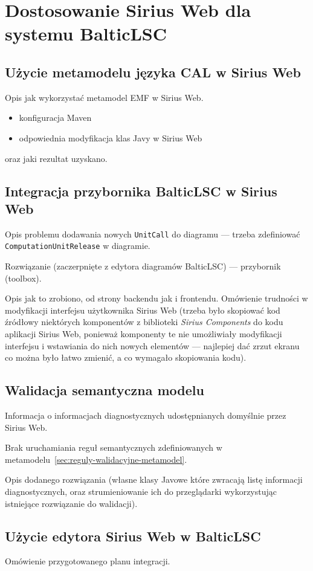 \chapter{Dostosowanie Sirius Web dla systemu BalticLSC}

\section{Użycie metamodelu języka CAL w Sirius Web}

Opis jak wykorzystać metamodel EMF w Sirius Web.

\begin{itemize}
	\item konfiguracja Maven
	\item odpowiednia modyfikacja klas Javy w Sirius Web
\end{itemize}

\noindent oraz jaki rezultat uzyskano.

\section{Integracja przybornika BalticLSC w Sirius Web}

Opis problemu dodawania nowych \texttt{UnitCall} do diagramu --- trzeba
zdefiniować \texttt{ComputationUnitRelease} w diagramie.

Rozwiązanie (zaczerpnięte z edytora diagramów BalticLSC) --- przybornik
(toolbox).

Opis jak to zrobiono, od strony backendu jak i frontendu. Omówienie trudności w
modyfikacji interfejsu użytkownika Sirius Web (trzeba było skopiować kod
źródłowy niektórych komponentów z biblioteki \textit{Sirius Components} do kodu
aplikacji Sirius Web, ponieważ komponenty te nie umożliwiały modyfikacji
interfejsu i wstawiania do nich nowych elementów --- najlepiej dać zrzut ekranu
co można było łatwo zmienić, a co wymagało skopiowania kodu).

\section{Walidacja semantyczna modelu}

Informacja o informacjach diagnostycznych udostępnianych domyślnie przez Sirius
Web.

Brak uruchamiania reguł semantycznych zdefiniowanych w
metamodelu~\ref{sec:reguly-walidacyjne-metamodel}.

Opis dodanego rozwiązania (własne klasy Javowe które zwracają listę informacji
diagnostycznych, oraz strumieniowanie ich do przeglądarki wykorzystując
istniejące rozwiązanie do walidacji).

\section{Użycie edytora Sirius Web w BalticLSC}

Omówienie przygotowanego planu integracji.
